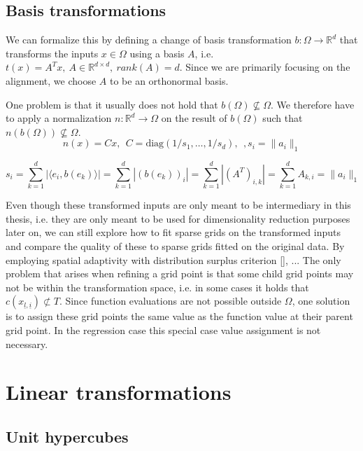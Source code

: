 \documentclass[
  a4paper,  %
  twoside,  %
  bibliography=totoc,
  headsepline,
  cleardoublepage=empty,
  parskip=half,
  draft=false
]{scrbook}
\begin{document}

\section{Basis transformations}

We can formalize this by defining a change of basis transformation $b \colon \Omega \to \mathds{R}^d$ that transforms the inputs $x \in \Omega$ using a basis $A$, i.e. $t(x)=A^Tx, ~ A \in \mathds{R}^{d \times d}, ~ rank(A)=d$.
Since we are primarily focusing on the alignment, we choose $A$ to be an orthonormal basis.

One problem is that it usually does not hold that $b(\Omega) \nsubseteq \Omega$.
We therefore have to apply a normalization $n \colon \mathds{R}^d \to \Omega$ on the result of $b(\Omega)$ such that $n(b(\Omega)) \nsubseteq \Omega$.
\begin{equation}
n(x)=Cx , ~~
C=\text{diag}(1 / s_1, \dots, 1 / s_d), ~~, s_i = \|a_i\|_1
\label{alignment}
\end{equation}

\begin{equation}
s_i=\sum_{k=1}^d |\langle e_i, b(e_k) \rangle| = \sum_{k=1}^d |(b(e_k))_i| = \sum_{k=1}^d |(A^T)_{i,k}| = \sum_{k=1}^d A_{k,i}= \|a_i\|_1
\end{equation}

Even though these transformed inputs are only meant to be intermediary in this thesis, i.e. they are only meant to be used for dimensionality reduction purposes later on, we can still explore how to fit sparse grids on the transformed inputs and compare the quality of these to sparse grids fitted on the original data.
By employing spatial adaptivity with distribution surplus criterion \eqref{}, ...
The only problem that arises when refining a grid point is that some child grid points may not be within the transformation space, i.e. in some cases it holds that $c(x_{\underline{l},\underline{i}}) \nsubset T$.
Since function evaluations are not possible outside $\Omega$, one solution is to assign these grid points the same value as the function value at their parent grid point.
In the regression case this special case value assignment is not necessary.

\chapter{Linear transformations}

\section{Unit hypercubes}
\end{document}
